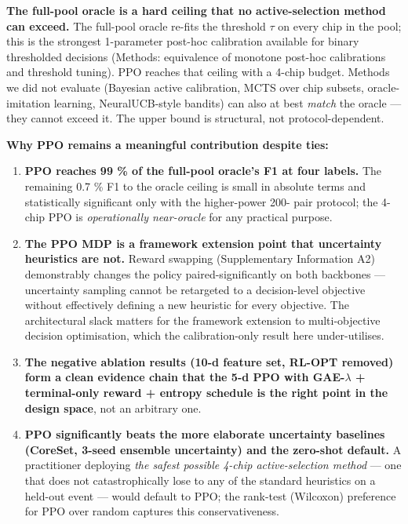 \documentclass[sn-nature,lineno]{sn-jnl}
\providecommand{\tightlist}{\setlength{\itemsep}{0pt}\setlength{\parskip}{0pt}}
\theoremstyle{thmstyleone}
\theoremstyle{thmstyletwo}
\theoremstyle{thmstylethree}
\begin{document}
\textbf{The full-pool oracle is a hard ceiling that no active-selection method
can exceed.} The full-pool oracle re-fits the threshold $\tau$ on every chip
in the pool; this is the strongest 1-parameter post-hoc calibration
available for binary thresholded decisions (Methods: equivalence of
monotone post-hoc calibrations and threshold tuning). PPO reaches that
ceiling with a 4-chip budget. Methods we did not evaluate (Bayesian
active calibration, MCTS over chip subsets, oracle-imitation learning,
NeuralUCB-style bandits) can also at best \emph{match} the oracle --- they
cannot exceed it. The upper bound is structural, not protocol-dependent.

\textbf{Why PPO remains a meaningful contribution despite ties:}

\begin{enumerate}
\def\labelenumi{\arabic{enumi}.}
\tightlist
\item
  \textbf{PPO reaches 99 \% of the full-pool oracle's F1 at four labels.}
  The remaining 0.7 \% F1 to the oracle ceiling is small in absolute
  terms and statistically significant only with the higher-power 200-
  pair protocol; the 4-chip PPO is \emph{operationally near-oracle} for
  any practical purpose.
\item
  \textbf{The PPO MDP is a framework extension point that uncertainty
  heuristics are not.} Reward swapping (Supplementary Information A2)
  demonstrably changes the policy paired-significantly on both
  backbones --- uncertainty sampling cannot be retargeted to a
  decision-level objective without effectively defining a new
  heuristic for every objective. The architectural slack matters for
  the framework extension to multi-objective decision optimisation,
  which the calibration-only result here under-utilises.
\item
  \textbf{The negative ablation results (10-d feature set, RL-OPT removed)
  form a clean evidence chain that the 5-d PPO with GAE-$\lambda$ +
  terminal-only reward + entropy schedule is the right point in the
  design space}, not an arbitrary one.
\item
  \textbf{PPO significantly beats the more elaborate uncertainty baselines
  (CoreSet, 3-seed ensemble uncertainty) and the zero-shot default.}
  A practitioner deploying \emph{the safest possible 4-chip
  active-selection method} --- one that does not catastrophically lose
  to any of the standard heuristics on a held-out event --- would
  default to PPO; the rank-test (Wilcoxon) preference for PPO over
  random captures this conservativeness.
\end{enumerate}
\end{document}
